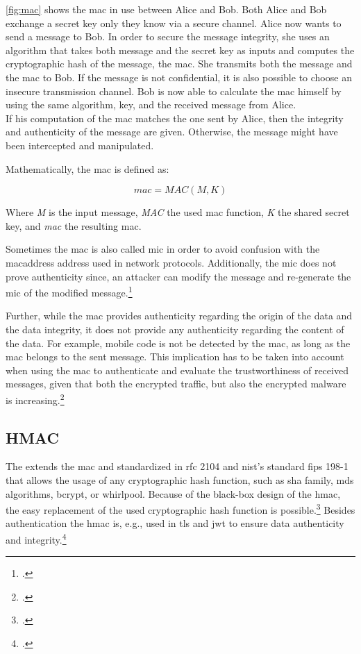 \autoref{fig:mac} shows the \gls{mac} in use between Alice and Bob. Both Alice and Bob exchange a secret key only they know via a secure channel. Alice now wants to send a message to Bob. In order to secure the message integrity, she uses an algorithm that takes both message and the secret key as inputs and computes the cryptographic hash of the message, the \gls{mac}. She transmits both the message and the \gls{mac} to Bob. If the message is not confidential, it is also possible to choose an insecure transmission channel. Bob is now able to calculate the \gls{mac} himself by using the same algorithm, key, and the received message from Alice.\\
If his computation of the \gls{mac} matches the one sent by Alice, then the integrity and authenticity of the message are given. Otherwise, the message might have been intercepted and manipulated.

Mathematically, the \gls{mac} is defined as:

\begin{equation*}
	mac = MAC(M, K)
\end{equation*}

Where \textit{M} is the input message, \textit{MAC} the used \gls{mac} function, \textit{K} the shared secret key, and \textit{mac} the resulting \glsdesc{mac}.

Sometimes the \gls{mac} is also called \gls{mic} in order to avoid confusion with the \gls{macaddress} address used in network protocols. Additionally, the \gls{mic} does not prove authenticity since, an attacker can modify the message and re-generate the \gls{mic} of the modified message.\footcites[See][60--62]{265831}

Further, while the \gls{mac} provides authenticity regarding the origin of the data and the data integrity, it does not provide any authenticity regarding the content of the data. For example, mobile code is not be detected by the \gls{mac}, as long as the \gls{mac} belongs to the sent message. This implication has to be taken into account when using the \gls{mac} to authenticate and evaluate the trustworthiness of received messages, given that both the encrypted traffic, but also the encrypted malware is increasing.\footcites[See][100]{weldon2015}

\subsection{HMAC}

The  extends the \gls{mac} and standardized in \gls{rfc} 2104 and \gls{nist}'s standard \gls{fips} 198-1 that allows the usage of any cryptographic hash function, such as \gls{sha} family, \glspl{md} algorithms, bcrypt, or whirlpool. Because of the black-box design of the \gls{hmac}, the easy replacement of the used cryptographic hash function is possible.\footcites[See][]{krawczyk1997rfc}[See][]{FIPS198} Besides authentication the \gls{hmac} is, e.g., used in \gls{tls} and \gls{jwt} to ensure data authenticity and integrity.\footcites[See][14]{rfc5246}[See][8]{rfc7519}[See][3--4]{s2011rfc}


